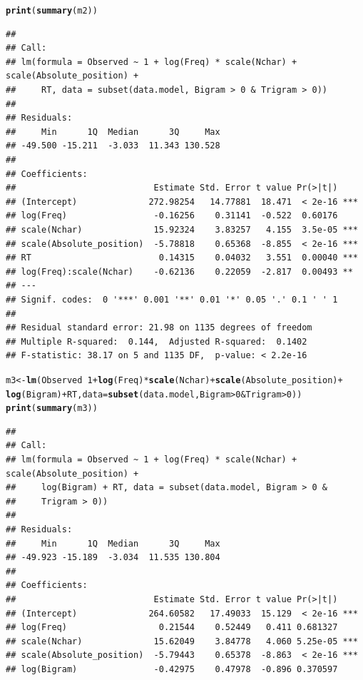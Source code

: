 \documentclass{article}\usepackage[]{graphicx}\usepackage[]{color}
\makeatletter
\newcommand{\hlnum}[1]{\textcolor[rgb]{0.686,0.059,0.569}{#1}}%
\newcommand{\hlopt}[1]{\textcolor[rgb]{0,0,0}{#1}}%
\newcommand{\hlstd}[1]{\textcolor[rgb]{0.345,0.345,0.345}{#1}}%
\newcommand{\hlkwb}[1]{\textcolor[rgb]{0.69,0.353,0.396}{#1}}%
\newcommand{\hlkwc}[1]{\textcolor[rgb]{0.333,0.667,0.333}{#1}}%
\newcommand{\hlkwd}[1]{\textcolor[rgb]{0.737,0.353,0.396}{\textbf{#1}}}%
\newenvironment{kframe}{%
 \def\at@end@of@kframe{}%
 \ifinner\ifhmode%
  \def\at@end@of@kframe{\end{minipage}}%
  \begin{minipage}{\columnwidth}%
 \fi\fi%
 \def\FrameCommand##1{\hskip\@totalleftmargin \hskip-\fboxsep
 \colorbox{shadecolor}{##1}\hskip-\fboxsep
     \hskip-\linewidth \hskip-\@totalleftmargin \hskip\columnwidth}%
 \MakeFramed {\advance\hsize-\width
   \@totalleftmargin\z@ \linewidth\hsize
   \@setminipage}}%
 {\par\unskip\endMakeFramed%
 \at@end@of@kframe}
\newenvironment{knitrout}{}{} %
\makeatother
\begin{document}
\begin{knitrout}
\begin{kframe}
\begin{alltt}
\hlkwd{print}\hlstd{(}\hlkwd{summary}\hlstd{(m2))}
\end{alltt}
\begin{verbatim}
## 
## Call:
## lm(formula = Observed ~ 1 + log(Freq) * scale(Nchar) + scale(Absolute_position) + 
##     RT, data = subset(data.model, Bigram > 0 & Trigram > 0))
## 
## Residuals:
##     Min      1Q  Median      3Q     Max 
## -49.500 -15.211  -3.033  11.343 130.528 
## 
## Coefficients:
##                           Estimate Std. Error t value Pr(>|t|)    
## (Intercept)              272.98254   14.77881  18.471  < 2e-16 ***
## log(Freq)                 -0.16256    0.31141  -0.522  0.60176    
## scale(Nchar)              15.92324    3.83257   4.155  3.5e-05 ***
## scale(Absolute_position)  -5.78818    0.65368  -8.855  < 2e-16 ***
## RT                         0.14315    0.04032   3.551  0.00040 ***
## log(Freq):scale(Nchar)    -0.62136    0.22059  -2.817  0.00493 ** 
## ---
## Signif. codes:  0 '***' 0.001 '**' 0.01 '*' 0.05 '.' 0.1 ' ' 1
## 
## Residual standard error: 21.98 on 1135 degrees of freedom
## Multiple R-squared:  0.144,	Adjusted R-squared:  0.1402 
## F-statistic: 38.17 on 5 and 1135 DF,  p-value: < 2.2e-16
\end{verbatim}
\begin{alltt}
\hlstd{m3} \hlkwb{<-} \hlkwd{lm}\hlstd{(Observed} \hlopt{~} \hlnum{1} \hlopt{+} \hlkwd{log}\hlstd{(Freq)} \hlopt{*} \hlkwd{scale}\hlstd{(Nchar)} \hlopt{+} \hlkwd{scale}\hlstd{(Absolute_position)} \hlopt{+}
    \hlkwd{log}\hlstd{(Bigram)} \hlopt{+} \hlstd{RT,} \hlkwc{data} \hlstd{=} \hlkwd{subset}\hlstd{(data.model, Bigram} \hlopt{>} \hlnum{0} \hlopt{&} \hlstd{Trigram} \hlopt{>} \hlnum{0}\hlstd{))}
\hlkwd{print}\hlstd{(}\hlkwd{summary}\hlstd{(m3))}
\end{alltt}
\begin{verbatim}
## 
## Call:
## lm(formula = Observed ~ 1 + log(Freq) * scale(Nchar) + scale(Absolute_position) + 
##     log(Bigram) + RT, data = subset(data.model, Bigram > 0 & 
##     Trigram > 0))
## 
## Residuals:
##     Min      1Q  Median      3Q     Max 
## -49.923 -15.189  -3.034  11.535 130.804 
## 
## Coefficients:
##                           Estimate Std. Error t value Pr(>|t|)    
## (Intercept)              264.60582   17.49033  15.129  < 2e-16 ***
## log(Freq)                  0.21544    0.52449   0.411 0.681327    
## scale(Nchar)              15.62049    3.84778   4.060 5.25e-05 ***
## scale(Absolute_position)  -5.79443    0.65378  -8.863  < 2e-16 ***
## log(Bigram)               -0.42975    0.47978  -0.896 0.370597    

\end{verbatim}
\end{kframe}
\end{knitrout}
\end{document}
